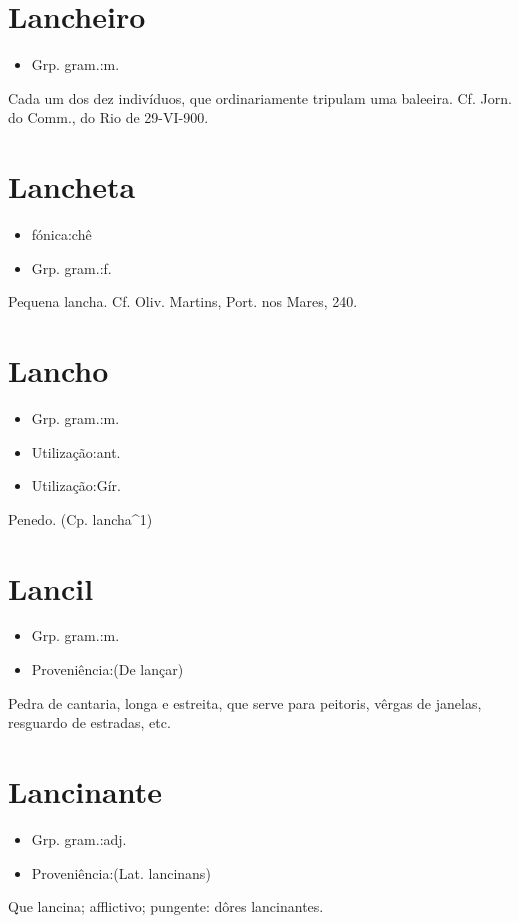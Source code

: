 \section{Lancheiro}
\begin{itemize}
\item {Grp. gram.:m.}
\end{itemize}
Cada um dos dez indivíduos, que ordinariamente tripulam uma baleeira. Cf. \textunderscore Jorn. do Comm.\textunderscore , do Rio de 29-VI-900.
\section{Lancheta}
\begin{itemize}
\item {fónica:chê}
\end{itemize}
\begin{itemize}
\item {Grp. gram.:f.}
\end{itemize}
Pequena lancha. Cf. Oliv. Martins, \textunderscore Port. nos Mares\textunderscore , 240.
\section{Lancho}
\begin{itemize}
\item {Grp. gram.:m.}
\end{itemize}
\begin{itemize}
\item {Utilização:ant.}
\end{itemize}
\begin{itemize}
\item {Utilização:Gír.}
\end{itemize}
Penedo.
(Cp. \textunderscore lancha\textunderscore ^1)
\section{Lancil}
\begin{itemize}
\item {Grp. gram.:m.}
\end{itemize}
\begin{itemize}
\item {Proveniência:(De \textunderscore lançar\textunderscore )}
\end{itemize}
Pedra de cantaria, longa e estreita, que serve para peitoris, vêrgas de janelas, resguardo de estradas, etc.
\section{Lancinante}
\begin{itemize}
\item {Grp. gram.:adj.}
\end{itemize}
\begin{itemize}
\item {Proveniência:(Lat. \textunderscore lancinans\textunderscore )}
\end{itemize}
Que lancina; afflictivo; pungente: \textunderscore dôres lancinantes\textunderscore .

